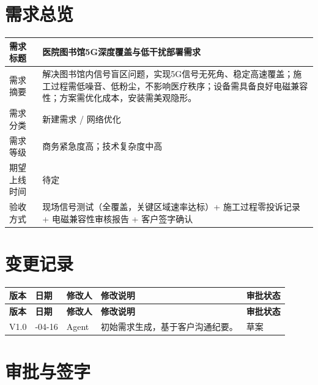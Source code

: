 \documentclass[12pt,a4paper]{ctexart}
\begin{document}
\section{需求总览}

\begin{tabularx}{\textwidth}{|P{3.2cm}|Y|}
\hline
需求标题 & 医院图书馆5G深度覆盖与低干扰部署需求
 \\ \hline
需求摘要 & 解决图书馆内信号盲区问题，实现5G信号无死角、稳定高速覆盖；施工过程需低噪音、低粉尘，不影响医疗秩序；设备需具备良好电磁兼容性；方案需优化成本，安装需美观隐形。
 \\ \hline
需求分类 & 新建需求 / 网络优化
 \\ \hline
需求等级 & 商务紧急度高；技术复杂度中高
 \\ \hline
期望上线时间 & 待定
 \\ \hline
验收方式 & 现场信号测试（全覆盖，关键区域速率达标）+ 施工过程零投诉记录 + 电磁兼容性审核报告 + 客户签字确认
 \\ \hline
\end{tabularx}

\section{变更记录}

\begin{longtable}{|>{\centering\arraybackslash}p{1.4cm}|
                  >{\centering\arraybackslash}p{2.1cm}|
                  >{\centering\arraybackslash}p{1.8cm}|
                  >{\raggedright\arraybackslash}p{6.0cm}|
                  >{\centering\arraybackslash}p{1.8cm}|}
\hline
\textbf{版本} & \textbf{日期} & \textbf{修改人} & \textbf{修改说明} & \textbf{审批状态} \\
\hline
\endfirsthead

\hline
\textbf{版本} & \textbf{日期} & \textbf{修改人} & \textbf{修改说明} & \textbf{审批状态} \\
\hline
\endhead

\hline
\endfoot

\hline
\endlastfoot

V1.0 & 2026-04-16 & Agent & 初始需求生成，基于客户沟通纪要。 & 草案 \\ \hline
\end{longtable}

\section{审批与签字}
\end{document}
